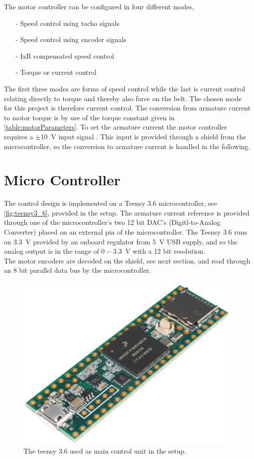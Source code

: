 The motor controller can be configured in four different modes, \cite{maxonMotorController}
\vspace{-10pt}
\begin{itemize}
  \item[-] Speed control using tacho signals
  \item[-] Speed control using encoder signals
  \item[-] IxR compensated speed control
  \item[-] Torque or current control
\end{itemize}
\vspace{-10pt}
The first three modes are forms of speed control while the last is current control relating directly to torque and thereby also force on the belt. The chosen mode for this project is therefore current control. The conversion from armature current to motor torque is by use of the torque constant given in \autoref{table:motorParameters}. To set the armature current the motor controller requires a $\pm$\SI{10}{V} input signal \cite{maxonMotorController}. This input is provided through a shield from the microcontroller, so the conversion to armature current is handled in the following.

\section{Micro Controller}
The control design is implemented on a Teensy 3.6 microcontroller, see \autoref{fig:teensy3_6}, provided in the setup. The armature current reference is provided through one of the microcontroller's two 12 bit DAC's (Digitl-to-Analog Converter) placed on an external pin of the microcontroller. The Teensy 3.6 runs on \SI{3.3}{V} provided by an onboard regulator from \SI{5}{V} USB supply, and so the analog output is in the range of $0-$\SI{3.3}{V} with a 12 bit resolution.\cite{teensyDataSheet}\\
The motor encoders are decoded on the shield, see next section, and read through an 8 bit parallel data bus by the microcontroller.

\begin{figure}[H]
  \includegraphics[width=.2\textwidth]{figures/teensy3_6}
  \caption{The teensy 3.6 used as main control unit in the setup. \cite{sprkfunTeensy}}
  \label{fig:teensy3_6}
\end{figure}

